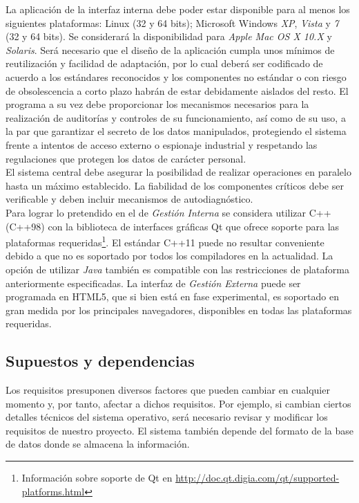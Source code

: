 \documentclass[11pt, a4paper, twoside]{report}
\begin{document}
			La aplicación de la interfaz interna debe poder estar disponible para al menos los siguientes plataformas: \gls{Linux} (32 y 64 bits); \gls{Microsoft Windows} \textit{XP},  \textit{Vista} y \textit{7} (32 y 64 bits). Se considerará la disponibilidad para \textit{Apple Mac OS X 10.X} y \textit{Solaris}. Será necesario que el diseño de la aplicación cumpla unos mínimos de reutilización y facilidad de adaptación, por lo cual deberá ser codificado de acuerdo a los estándares reconocidos y los componentes no estándar o con riesgo de obsolescencia a corto plazo habrán de estar debidamente aislados del resto. El programa a su vez debe proporcionar los mecanismos necesarios para la realización de auditorías y controles de su funcionamiento, así como de su uso, a la par que garantizar el secreto de los datos manipulados, protegiendo el sistema frente a intentos de acceso externo o espionaje industrial y respetando las regulaciones que protegen los datos de carácter personal.\\

			El sistema \software central debe asegurar la posibilidad de realizar operaciones en paralelo hasta un máximo establecido. La fiabilidad de los componentes críticos debe ser verificable y deben incluir mecanismos de autodiagnóstico.\\

			Para lograr lo pretendido en el \software de \textit{Gestión Interna} se considera utilizar \gls{C++} (C++98) con la biblioteca de interfaces gráficas \gls{Qt} que ofrece soporte para las plataformas requeridas\footnote{Información sobre soporte de Qt en \url{http://doc.qt.digia.com/qt/supported-platforms.html}}. El estándar C++11 puede no resultar conveniente debido a que no es soportado por todos los compiladores en la actualidad. La opción de utilizar \textit{Java} también es compatible con las restricciones de plataforma anteriormente especificadas. La interfaz de \textit{Gestión Externa} puede ser programada en \gls{HTML5}, que si bien está en fase experimental, es soportado en gran medida por los principales navegadores, disponibles en todas las plataformas requeridas.

		\subsection{Supuestos y dependencias}
			Los requisitos presuponen diversos factores que pueden cambiar en cualquier momento y, por tanto, afectar a dichos requisitos. Por ejemplo, si cambian ciertos detalles técnicos del sistema operativo, será necesario revisar y modificar los requisitos de nuestro proyecto. El sistema también depende del formato de la base de datos donde se almacena la información. \\
			
\end{document}
